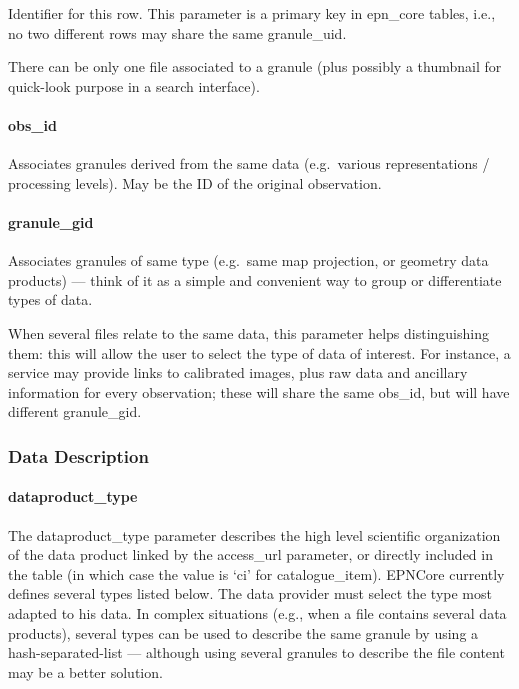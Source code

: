 \documentclass[11pt,a4paper]{ivoa}
\begin{document}
Identifier for this row. This parameter is a primary key in epn\_core
tables, i.e., no two different rows may share the same granule\_uid.

There can be only one file associated to a granule (plus possibly a
thumbnail for quick-look purpose in a search interface).

\paragraph{obs\_id}

Associates granules derived from the same data (e.g.\ various
representations / processing levels). May be the ID of the original
observation.

\paragraph{granule\_gid}

Associates granules of same type (e.g.\ same map projection, or geometry
data products) --- think of it as a simple and convenient way to group or
differentiate types of data.

When several files relate to the same data, this parameter helps
distinguishing them: this will allow the user to select the type of data
of interest.  For instance, a service may provide links to calibrated images,
plus raw data and ancillary information for every observation; these
will share the same obs\_id, but will have different granule\_gid.

\subsubsection{Data Description}

\paragraph{dataproduct\_type}

The dataproduct\_type parameter describes the high level scientific
organization of the data product linked by the access\_url parameter,
or directly included in the table (in which case the value is `ci'
for catalogue\_item). EPNCore currently defines several types listed
below. The data provider must select the type most adapted to his
data. In complex situations (e.g., when a file contains several data
products), several types can be used to describe the same granule by
using a hash-separated-list — although using several granules to
describe the file content may be a better solution.
\end{document}
